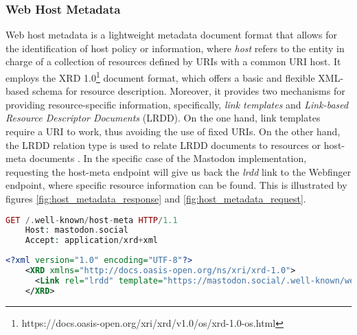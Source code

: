 \subsubsection{Web Host Metadata}
    Web host metadata is a lightweight metadata document format that allows for the identification of host policy or information, where \emph{host} refers to the entity in charge of a collection of resources defined by URIs with a common URI host. It employs the XRD 1.0\footnote{https://docs.oasis-open.org/xri/xrd/v1.0/os/xrd-1.0-os.html} document format, which offers a basic and flexible XML-based schema for resource description. Moreover, it provides two mechanisms for providing resource-specific information, specifically,  \emph{link templates} and \emph{Link-based Resource Descriptor Documents} (LRDD). On the one hand, link templates require a URI to work, thus avoiding the use of fixed URIs. On the other hand, the LRDD relation type is used to relate LRDD documents to resources or host-meta documents \cite{cook_2011}. In the specific case of the Mastodon implementation, requesting the host-meta endpoint will give us back the \emph{lrdd} link to the Webfinger endpoint, where specific resource information can be found. This is illustrated by figures \ref{fig:host_metadata_response} and \ref{fig:host_metadata_request}.

\lstset{style=JSONStyle}
\begin{lstlisting}[language=PHP, caption=Example Host Metadata request to mastodon.social, label=fig:host_metadata_request, float=h]
    GET /.well-known/host-meta HTTP/1.1
    Host: mastodon.social
    Accept: application/xrd+xml
\end{lstlisting}

\lstset{style=JSONStyle}
\begin{lstlisting}[language=XML, caption=Example Host metadata response from mastodon.social, label=fig:host_metadata_response, float=h!]
    <?xml version="1.0" encoding="UTF-8"?>
    <XRD xmlns="http://docs.oasis-open.org/ns/xri/xrd-1.0">
      <Link rel="lrdd" template="https://mastodon.social/.well-known/webfinger?resource={uri}"/>
    </XRD>
\end{lstlisting}


